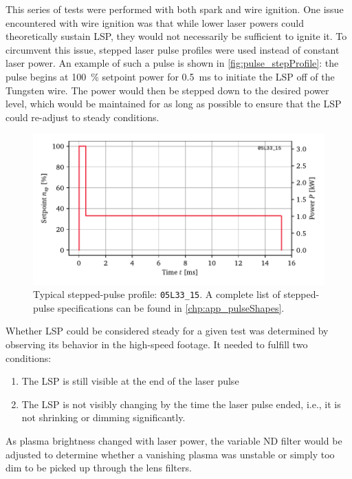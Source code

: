            This series of tests were performed with both spark and wire ignition. One issue encountered with wire ignition was that while lower laser powers could theoretically sustain LSP, they would not necessarily be sufficient to ignite it. To circumvent this issue, stepped laser pulse profiles were used instead of constant laser power. An example of such a pulse is shown in \autoref{fig:pulse_stepProfile}: the pulse begins at 100~\% setpoint power for \qty{0.5}{ms} to initiate the LSP off of the Tungsten wire. The power would then be stepped down to the desired power level, which would be maintained for as long as possible to ensure that the LSP could re-adjust to steady conditions.

            \begin{figure}[h]
                \centering
                \includegraphics[]{assets/5 results/pulse_profile}
                \caption[Typical stepped-pulse profile: \texttt{05L33\_15}]{Typical stepped-pulse profile: \texttt{05L33\_15}. A complete list of stepped-pulse specifications can be found in \autoref{chp:app_pulseShapes}.}
                \label{fig:pulse_stepProfile}
            \end{figure}

            Whether LSP could be considered steady for a given test was determined by observing its behavior in the high-speed footage. It needed to fulfill two conditions:
            \begin{enumerate}
                \item The LSP is still visible at the end of the laser pulse
                \item The LSP is not visibly changing by the time the laser pulse ended, i.e., it is not shrinking or dimming significantly.
            \end{enumerate}
            As plasma brightness changed with laser power, the variable ND filter would be adjusted to determine whether a vanishing plasma was unstable or simply too dim to be picked up through the lens filters.


